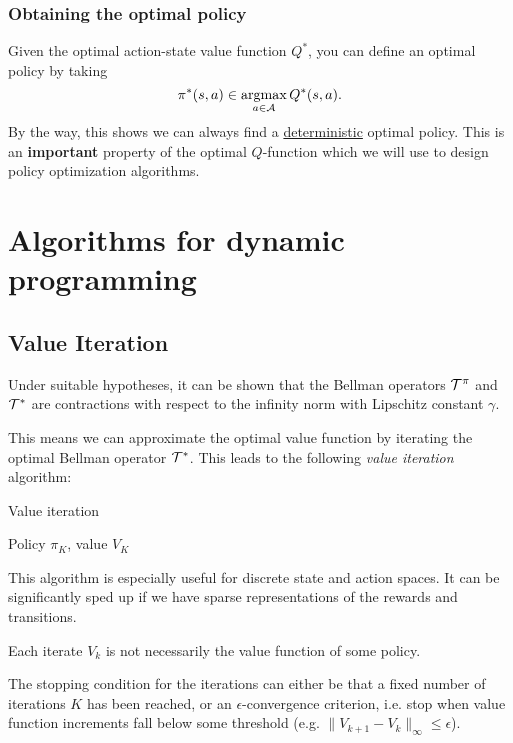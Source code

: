 \documentclass[../course-notes.tex]{subfiles}
\begin{document}
\subsubsection{Obtaining the optimal policy}

Given the optimal action-state value function $Q^*$, you can define an optimal policy by taking
\[
	\pi^*(s,a) \in \operatorname*{\mathrm{argmax}}_{a\in\mathcal{A}} Q^*(s,a).
\]
By the way, this shows we can always find a \underline{deterministic} optimal policy. This is an \textbf{important} property of the optimal $Q$-function which we will use to design policy optimization algorithms.


\section{Algorithms for dynamic programming}



\subsection{Value Iteration}

Under suitable hypotheses, it can be shown that the Bellman operators $\mathcal{T}^\pi$ and $\mathcal{T}^*$ are contractions with respect to the infinity norm with Lipschitz constant $\gamma$.

This means we can approximate the optimal value function by iterating the optimal Bellman operator $\mathcal{T}^*$. This leads to the following \textit{value iteration} algorithm:

\begin{algorithm}
	\caption{Value iteration}
	\Return Policy $\pi_K$, value $V_K$\;
\end{algorithm}

This algorithm is especially useful for discrete state and action spaces. It can be significantly sped up if we have sparse representations of the rewards and transitions.

Each iterate $V_k$ is not necessarily the value function of some policy.

The stopping condition for the iterations can either be that a fixed number of iterations $K$ has been reached, or an $\epsilon$-convergence criterion, i.e. stop when value function increments fall below some threshold (e.g. $\|V_{k+1} - V_k\|_{\infty} \leq \epsilon$).
\end{document}
